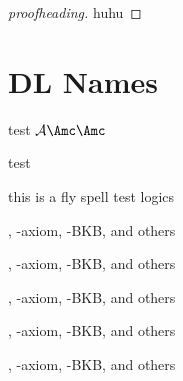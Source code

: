 \begin{proof}[proofheading]
  huhu 
\end{proof}

\section{DL Names}
\label{sec:dl-names}

\ALCALC \SHOIQSHOIQ \ALC \ALC

{\Huge \textbf{\ALCALC} test $\mathcal{A} \Amc \mathbf{\Amc}$ \textbf{\A}

\textbf{\SHOIQSHOIQ}}

test

this is a fly spell test logics 

\ALC, \ALC-axiom, \ALC-BKB, \ALC and others

\SHOIQ, \SHOIQ-axiom, \SHOIQ-BKB, \SHOIQ and others

\ALCALC, \ALCALC-axiom, \ALCALC-BKB, \ALCALC and others

\LMLO, \LMLO-axiom, \LMLO-BKB, \LMLO and others

\LMEL, \ELLO-axiom, \ELSHOIQ-BKB, \ELSHOIQ and others

\textbf{\ALC}


